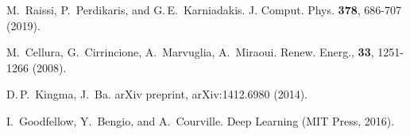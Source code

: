 \documentclass[pamm,a4paper,fleqn]{w-art}
\begin{document}
\vspace{\baselineskip}

\begin{thebibliography}{1}

  M.~Raissi, P.~Perdikaris, and G.\,E.~Karniadakis.
  J. Comput. Phys. \textbf{378}, 686-707 (2019).

  M.~Cellura, G.~Cirrincione, A.~Marvuglia, A.~Miraoui.
  Renew. Energ., \textbf{33}, 1251-1266 (2008).

  D.\,P.~Kingma, J.~Ba.
  arXiv preprint, arXiv:1412.6980 (2014).

  I.~Goodfellow, Y.~Bengio, and A.~Courville.
  Deep Learning (MIT Press, 2016).

\end{thebibliography}
\end{document}
